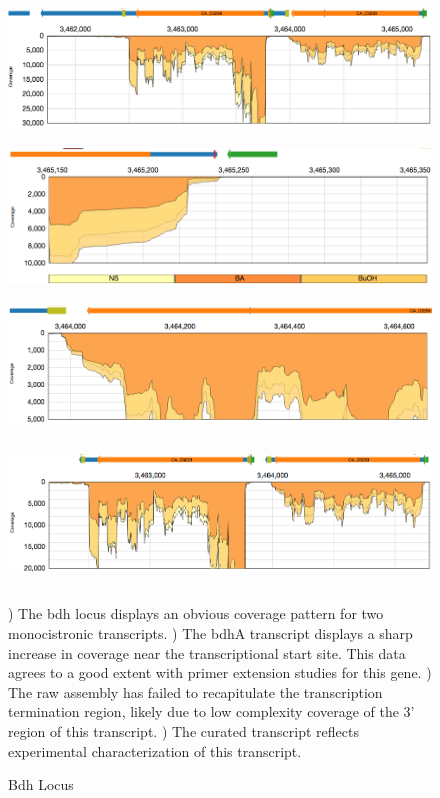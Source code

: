 \begin{figure}
{\includegraphics[width=\textwidth,height=1.5in]{images/Assembly/Examples/Bdh/Bdh-locus.png}
\label{fig:5.13a}}
{\includegraphics[width=\textwidth,height=1.5in]{images/Assembly/Examples/Bdh/BdhA-TSS.png}
\label{fig:5.13b}}
{\includegraphics[width=\textwidth,height=1.5in]{images/Assembly/Examples/Bdh/BdhA-termination.png}
\label{fig:5.13c}}
{\includegraphics[width=\textwidth,height=1.5in]{images/Assembly/Examples/Bdh/Bdh-curated.png}
\label{fig:5.13d}}
\caption{Bdh Locus}
) The bdh locus displays an obvious coverage pattern for two monocistronic transcripts. ) The bdhA transcript displays a sharp increase in coverage near the transcriptional start site. This data agrees to a good extent with primer extension studies for this gene. ) The raw assembly has failed to recapitulate the transcription termination region, likely due to low complexity coverage of the 3' region of this transcript. ) The curated transcript reflects experimental characterization of this transcript\cite{73}.
\end{figure}

